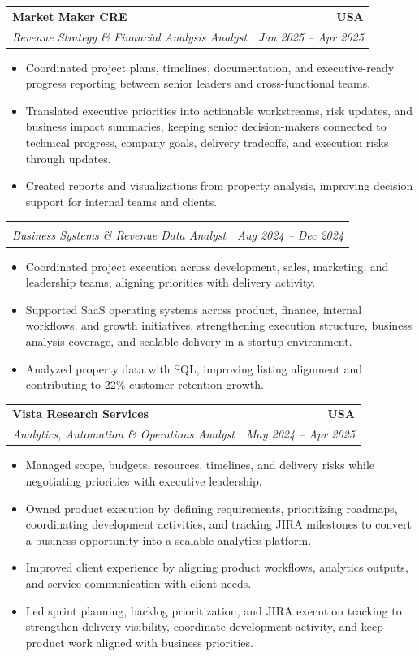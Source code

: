 \documentclass[letterpaper,10pt]{article}
\makeatletter
\newcommand{\resumeItem}[1]{\item \small{#1}}
\newcommand{\resumeSubheading}[4]{
  \vspace{1pt}\item
    \begin{tabular*}{1.0\textwidth}[t]{l@{\extracolsep{\fill}}r}
      \textbf{#1} & \textbf{\small #2} \\
      \textit{\small #3} & \textit{\small #4} \\
    \end{tabular*}\vspace{-6pt}
}
\newcommand{\resumeItemListStart}{\begin{itemize}[leftmargin=0.15in, itemsep=1pt, topsep=3pt]}
\newcommand{\resumeItemListEnd}{\end{itemize}\vspace{-2pt}}
\makeatother
\begin{document}
\vspace{-2pt}

\resumeSubheading
{Market Maker CRE}{USA}
{Revenue Strategy \& Financial Analysis Analyst}{Jan 2025 -- Apr 2025}
\resumeItemListStart
\resumeItem{Coordinated project plans, timelines, documentation, and executive-ready progress reporting between senior leaders and cross-functional teams.}
\resumeItem{Translated executive priorities into actionable workstreams, risk updates, and business impact summaries, keeping senior decision-makers connected to technical progress, company goals, delivery tradeoffs, and execution risks through updates.}
\resumeItem{Created reports and visualizations from property analysis, improving decision support for internal teams and clients.}
\resumeItemListEnd

\vspace{-12pt}

\resumeSubheading
{}{}
{Business Systems \& Revenue Data Analyst}{Aug 2024 -- Dec 2024}
\resumeItemListStart
\resumeItem{Coordinated project execution across development, sales, marketing, and leadership teams, aligning priorities with delivery activity.}
\resumeItem{Supported SaaS operating systems across product, finance, internal workflows, and growth initiatives, strengthening execution structure, business analysis coverage, and scalable delivery in a startup environment.}
\resumeItem{Analyzed property data with SQL, improving listing alignment and contributing to 22\% customer retention growth.}
\resumeItemListEnd

\vspace{-2pt}

\resumeSubheading
{Vista Research Services}{USA}
{Analytics, Automation \& Operations Analyst}{May 2024 -- Apr 2025}
\resumeItemListStart
\resumeItem{Managed scope, budgets, resources, timelines, and delivery risks while negotiating priorities with executive leadership.}
\resumeItem{Owned product execution by defining requirements, prioritizing roadmaps, coordinating development activities, and tracking JIRA milestones to convert a business opportunity into a scalable analytics platform.}
\resumeItem{Improved client experience by aligning product workflows, analytics outputs, and service communication with client needs.}
\resumeItem{Led sprint planning, backlog prioritization, and JIRA execution tracking to strengthen delivery visibility, coordinate development activity, and keep product work aligned with business priorities.}
\resumeItemListEnd

\vspace{-2pt}
\end{document}
